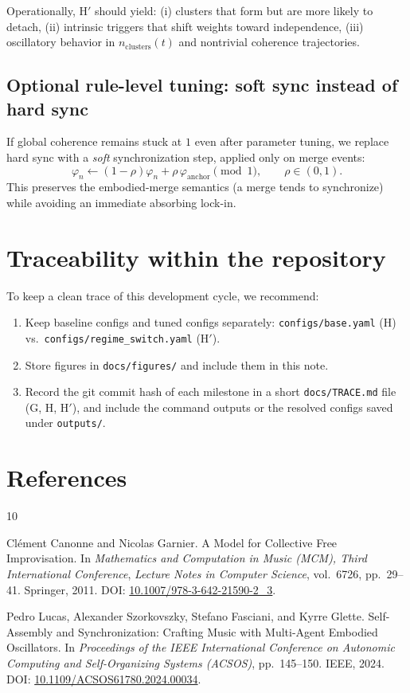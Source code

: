 \documentclass[11pt]{article}
\newcommand{\varph}{\varphi}    %
\begin{document}
Operationally, H$'$ should yield:
(i) clusters that form but are more likely to detach,
(ii) intrinsic triggers that shift weights toward independence,
(iii) oscillatory behavior in $n_{\text{clusters}}(t)$ and nontrivial coherence trajectories.

\subsection{Optional rule-level tuning: soft sync instead of hard sync}
If global coherence remains stuck at $1$ even after parameter tuning, we replace hard sync with a \emph{soft} synchronization step,
applied only on merge events:
\[
\varph_n \leftarrow (1-\rho)\varph_n + \rho\,\varph_{\text{anchor}} \pmod{1},
\qquad \rho\in(0,1).
\]
This preserves the embodied-merge semantics (a merge tends to synchronize) while avoiding an immediate absorbing lock-in.

\section{Traceability within the repository}
To keep a clean trace of this development cycle, we recommend:

\begin{enumerate}[leftmargin=2.2em]
\item Keep baseline configs and tuned configs separately:
\texttt{configs/base.yaml} (H) vs.\ \texttt{configs/regime\_switch.yaml} (H$'$).
\item Store figures in \texttt{docs/figures/} and include them in this note.
\item Record the git commit hash of each milestone in a short \texttt{docs/TRACE.md} file (G, H, H$'$),
and include the command outputs or the resolved configs saved under \texttt{outputs/}.
\end{enumerate}

\section{References}
\begin{thebibliography}{10}

Cl{\'e}ment Canonne and Nicolas Garnier.
\newblock A Model for Collective Free Improvisation.
\newblock In \emph{Mathematics and Computation in Music (MCM), Third International Conference},
  \emph{Lecture Notes in Computer Science}, vol.~6726, pp.~29--41. Springer, 2011.
\newblock DOI: \href{https://doi.org/10.1007/978-3-642-21590-2_3}{10.1007/978-3-642-21590-2\_3}.

Pedro Lucas, Alexander Szorkovszky, Stefano Fasciani, and Kyrre Glette.
\newblock Self-Assembly and Synchronization: Crafting Music with Multi-Agent Embodied Oscillators.
\newblock In \emph{Proceedings of the IEEE International Conference on Autonomic Computing and Self-Organizing Systems (ACSOS)},
  pp.~145--150. IEEE, 2024.
\newblock DOI: \href{https://doi.org/10.1109/ACSOS61780.2024.00034}{10.1109/ACSOS61780.2024.00034}.

\end{thebibliography}
\end{document}
